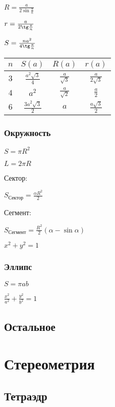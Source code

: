 $ R = \frac{a}{2\sin\frac{\pi}{n}} $

$ r = \frac{a}{2\tg\frac{\pi}{n}} $

$ S =  \frac{n a^2}{4\tg\frac{\pi}{n}} $

\begin{tabu}[t]{||c||c||c|c||}
	\hline
		$ n $ & $ S(a) $ & $ R(a) $ & $ r(a) $ \\
	\hline
	\hline
		$ 3 $ & $ \frac{a^2 \sqrt{3}}{4} $ & $ \frac{a}{\sqrt{3}} $ & $ \frac{a}{2 \sqrt{3}} $ \\
	\hline
		$ 4 $ & $ a^2 $ & $ \frac{a}{\sqrt{2}} $ & $ \frac{a}{2} $ \\
	\hline
		$ 6 $ & $ \frac{3 a^2 \sqrt{3}}{2} $ & $ a $ & $ \frac{a \sqrt{3}}{2} $ \\
	\hline
\end{tabu}

\subsubsection{Окружность}

$ S = \pi R^2 $

$ L = 2 \pi R $

Сектор:

$ S_{\text{Сектор}} = \frac{\alpha R^2}{2} $

Сегмент:

$ S_{\text{Сегмент}} = \frac{R^2}{2} (\alpha - \sin \alpha) $

$ x^2 + y^2 = 1 $

\subsubsection{Эллипс}

$ S = \pi a b $ 

$ \frac{x^2}{a^2} + \frac{y^2}{b^2} = 1 $

\subsection{Остальное}

\section{Стереометрия}

\subsection{Тетраэдр}

